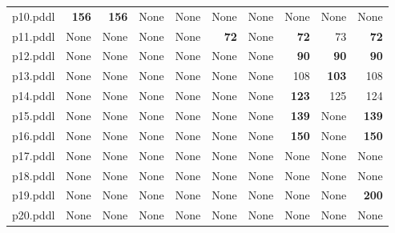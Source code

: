 \documentclass{article}
\begin{document}
\begin{tabular}{@{}lrrrrrrrrr@{}}
p10.pddl & \textbf{156} & \textbf{156} & \multicolumn{1}{|l|}{None} & \multicolumn{1}{|l|}{None} & \multicolumn{1}{|l|}{None} & \multicolumn{1}{|l|}{None} & \multicolumn{1}{|l|}{None} & \multicolumn{1}{|l|}{None} & \multicolumn{1}{|l|}{None} \\
p11.pddl & \multicolumn{1}{|l|}{None} & \multicolumn{1}{|l|}{None} & \multicolumn{1}{|l|}{None} & \multicolumn{1}{|l|}{None} & \textbf{72} & \multicolumn{1}{|l|}{None} & \textbf{72} & 73 & \textbf{72} \\
p12.pddl & \multicolumn{1}{|l|}{None} & \multicolumn{1}{|l|}{None} & \multicolumn{1}{|l|}{None} & \multicolumn{1}{|l|}{None} & \multicolumn{1}{|l|}{None} & \multicolumn{1}{|l|}{None} & \textbf{90} & \textbf{90} & \textbf{90} \\
p13.pddl & \multicolumn{1}{|l|}{None} & \multicolumn{1}{|l|}{None} & \multicolumn{1}{|l|}{None} & \multicolumn{1}{|l|}{None} & \multicolumn{1}{|l|}{None} & \multicolumn{1}{|l|}{None} & 108 & \textbf{103} & 108 \\
p14.pddl & \multicolumn{1}{|l|}{None} & \multicolumn{1}{|l|}{None} & \multicolumn{1}{|l|}{None} & \multicolumn{1}{|l|}{None} & \multicolumn{1}{|l|}{None} & \multicolumn{1}{|l|}{None} & \textbf{123} & 125 & 124 \\
p15.pddl & \multicolumn{1}{|l|}{None} & \multicolumn{1}{|l|}{None} & \multicolumn{1}{|l|}{None} & \multicolumn{1}{|l|}{None} & \multicolumn{1}{|l|}{None} & \multicolumn{1}{|l|}{None} & \textbf{139} & \multicolumn{1}{|l|}{None} & \textbf{139} \\
p16.pddl & \multicolumn{1}{|l|}{None} & \multicolumn{1}{|l|}{None} & \multicolumn{1}{|l|}{None} & \multicolumn{1}{|l|}{None} & \multicolumn{1}{|l|}{None} & \multicolumn{1}{|l|}{None} & \textbf{150} & \multicolumn{1}{|l|}{None} & \textbf{150} \\
p17.pddl & \multicolumn{1}{|l|}{None} & \multicolumn{1}{|l|}{None} & \multicolumn{1}{|l|}{None} & \multicolumn{1}{|l|}{None} & \multicolumn{1}{|l|}{None} & \multicolumn{1}{|l|}{None} & \multicolumn{1}{|l|}{None} & \multicolumn{1}{|l|}{None} & \multicolumn{1}{|l|}{None} \\
p18.pddl & \multicolumn{1}{|l|}{None} & \multicolumn{1}{|l|}{None} & \multicolumn{1}{|l|}{None} & \multicolumn{1}{|l|}{None} & \multicolumn{1}{|l|}{None} & \multicolumn{1}{|l|}{None} & \multicolumn{1}{|l|}{None} & \multicolumn{1}{|l|}{None} & \multicolumn{1}{|l|}{None} \\
p19.pddl & \multicolumn{1}{|l|}{None} & \multicolumn{1}{|l|}{None} & \multicolumn{1}{|l|}{None} & \multicolumn{1}{|l|}{None} & \multicolumn{1}{|l|}{None} & \multicolumn{1}{|l|}{None} & \multicolumn{1}{|l|}{None} & \multicolumn{1}{|l|}{None} & \textbf{200} \\
p20.pddl & \multicolumn{1}{|l|}{None} & \multicolumn{1}{|l|}{None} & \multicolumn{1}{|l|}{None} & \multicolumn{1}{|l|}{None} & \multicolumn{1}{|l|}{None} & \multicolumn{1}{|l|}{None} & \multicolumn{1}{|l|}{None} & \multicolumn{1}{|l|}{None} & \multicolumn{1}{|l|}{None} \\
\end{tabular}
\end{document}
